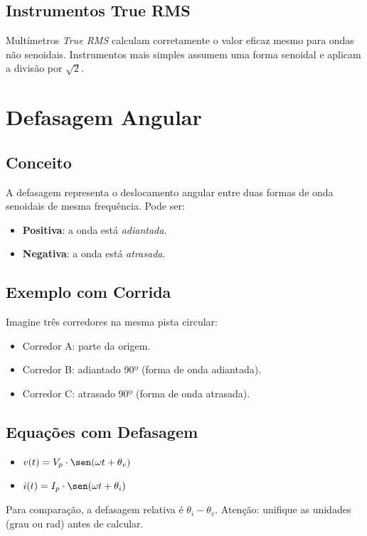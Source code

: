 \subsection{Instrumentos True RMS}
Multímetros \textit{True RMS} calculam corretamente o valor eficaz mesmo para ondas não senoidais. Instrumentos mais simples assumem uma forma senoidal e aplicam a divisão por \(\sqrt{2}\).

\section{Defasagem Angular}

\subsection{Conceito}
A defasagem representa o deslocamento angular entre duas formas de onda senoidais de mesma frequência. Pode ser:
\begin{itemize}
  \item \textbf{Positiva}: a onda está \textit{adiantada}.
  \item \textbf{Negativa}: a onda está \textit{atrasada}.
\end{itemize}

\subsection{Exemplo com Corrida}
Imagine três corredores na mesma pista circular:
\begin{itemize}
  \item Corredor A: parte da origem.
  \item Corredor B: adiantado 90º (forma de onda adiantada).
  \item Corredor C: atrasado 90º (forma de onda atrasada).
\end{itemize}

\subsection{Equações com Defasagem}

\begin{itemize}
  \item \(v(t) = V_p \cdot \sen(\omega t + \theta_v)\)
  \item \(i(t) = I_p \cdot \sen(\omega t + \theta_i)\)
\end{itemize}

Para comparação, a defasagem relativa é \(\theta_i - \theta_v\). Atenção: unifique as unidades (grau ou rad) antes de calcular.

